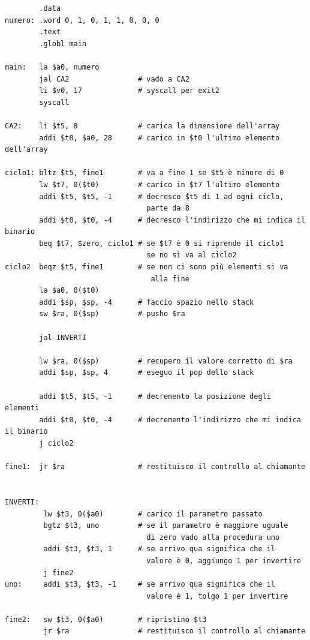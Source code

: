 \documentclass[a4paper,12pt, oneside]{book}
\begin{document}
\begin{verbatim}
        .data
numero: .word 0, 1, 0, 1, 1, 0, 0, 0
        .text
        .globl main
        
main:   la $a0, numero
        jal CA2                # vado a CA2
        li $v0, 17             # syscall per exit2
        syscall
        
CA2:    li $t5, 8              # carica la dimensione dell'array
        addi $t0, $a0, 28      # carico in $t0 l'ultimo elemento dell'array
        
ciclo1: bltz $t5, fine1        # va a fine 1 se $t5 è minore di 0
        lw $t7, 0($t0)         # carico in $t7 l'ultimo elemento
        addi $t5, $t5, -1      # decresco $t5 di 1 ad ogni ciclo, 
                                 parte da 8
        addi $t0, $t0, -4      # decresco l'indirizzo che mi indica il binario
        beq $t7, $zero, ciclo1 # se $t7 è 0 si riprende il ciclo1
                                 se no si va al ciclo2
ciclo2  beqz $t5, fine1        # se non ci sono più elementi si va 
                                  alla fine
        la $a0, 0($t0)
        addi $sp, $sp, -4      # faccio spazio nello stack
        sw $ra, 0($sp)         # pusho $ra
        
        jal INVERTI
        
        lw $ra, 0($sp)         # recupero il valore corretto di $ra
        addi $sp, $sp, 4       # eseguo il pop dello stack
        
        addi $t5, $t5, -1      # decremento la posizione degli elementi
        addi $t0, $t0, -4      # decremento l'indirizzo che mi indica il binario
        j ciclo2

fine1:  jr $ra                 # restituisco il controllo al chiamante


INVERTI:
         lw $t3, 0($a0)        # carico il parametro passato
         bgtz $t3, uno         # se il parametro è maggiore uguale
                                 di zero vado alla procedura uno
         addi $t3, $t3, 1      # se arrivo qua significa che il
                                 valore è 0, aggiungo 1 per invertire
         j fine2
uno:     addi $t3, $t3, -1     # se arrivo qua significa che il
                                 valore è 1, tolgo 1 per invertire
  
fine2:   sw $t3, 0($a0)        # ripristino $t3
         jr $ra                # restituisco il controllo al chiamante

\end{verbatim}
\end{document}
